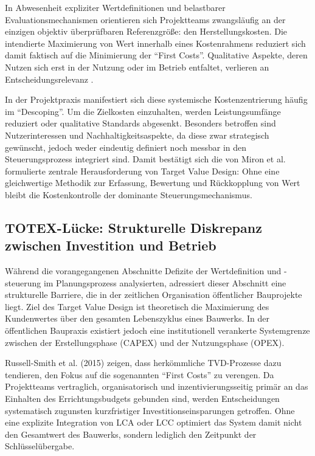 In Abwesenheit expliziter Wertdefinitionen und belastbarer Evaluationsmechanismen orientieren sich Projektteams zwangsläufig an der einzigen objektiv überprüfbaren Referenzgröße: den Herstellungskosten. Die intendierte Maximierung von Wert innerhalb eines Kostenrahmens reduziert sich damit faktisch auf die Minimierung der \enquote{First Costs}. Qualitative Aspekte, deren Nutzen sich erst in der Nutzung oder im Betrieb entfaltet, verlieren an Entscheidungsrelevanz \autocite[Vgl.][S.~44 f]{russell-smith_sustainable_2015}.

In der Projektpraxis manifestiert sich diese systemische Kostenzentrierung häufig im \enquote{Descoping}. Um die Zielkosten einzuhalten, werden Leistungsumfänge reduziert oder qualitative Standards abgesenkt. Besonders betroffen sind Nutzerinteressen und Nachhaltigkeitsaspekte, da diese zwar strategisch gewünscht, jedoch weder eindeutig definiert noch messbar in den Steuerungsprozess integriert sind. \autocite[Vgl.][S.~36 ff]{kozuch_nachhaltigkeit_2024}
Damit bestätigt sich die von Miron et al. formulierte zentrale Herausforderung von Target Value Design: Ohne eine gleichwertige Methodik zur Erfassung, Bewertung und Rückkopplung von Wert bleibt die Kostenkontrolle der dominante Steuerungsmechanismus.\autocite[Vgl.][S.~821]{miron_target_2015}

\subsection{TOTEX-Lücke: Strukturelle Diskrepanz zwischen Investition und Betrieb}
\label{sec:5.2.3}

Während die vorangegangenen Abschnitte Defizite der Wertdefinition und -steuerung im Planungsprozess analysierten, adressiert dieser Abschnitt eine strukturelle Barriere, die in der zeitlichen Organisation öffentlicher Bauprojekte liegt. Ziel des Target Value Design ist theoretisch die Maximierung des Kundenwertes über den gesamten Lebenszyklus eines Bauwerks. In der öffentlichen Baupraxis existiert jedoch eine institutionell verankerte Systemgrenze zwischen der Erstellungsphase (\acs{CAPEX}) und der Nutzungsphase (\acs{OPEX}).

Russell-Smith et al. (2015) zeigen, dass herkömmliche \acs{TVD}-Prozesse dazu tendieren, den Fokus auf die sogenannten \enquote{First Costs} zu verengen. Da Projektteams vertraglich, organisatorisch und inzentivierungsseitig primär an das Einhalten des Errichtungsbudgets gebunden sind, werden Entscheidungen systematisch zugunsten kurzfristiger Investitionseinsparungen getroffen. Ohne eine explizite Integration von \ac{LCA} oder \ac{LCC} optimiert das System damit nicht den Gesamtwert des Bauwerks, sondern lediglich den Zeitpunkt der Schlüsselübergabe\autocite[Vgl.][S.~45]{russell-smith_sustainable_2015}.

